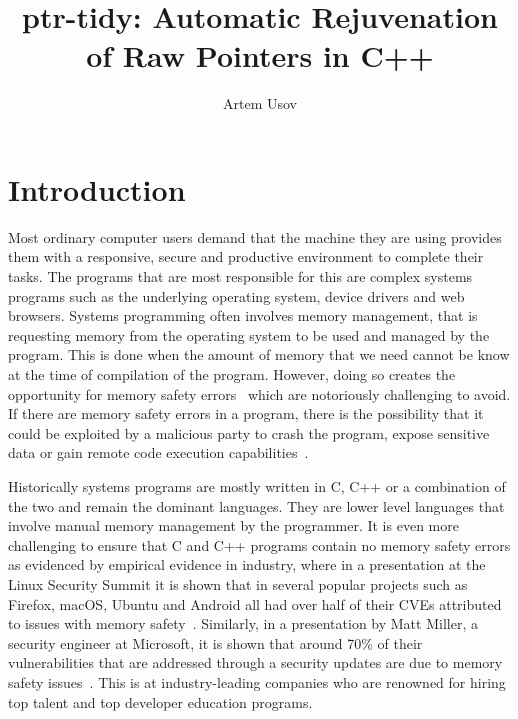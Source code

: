 \documentclass{mpaper}
\begin{document}
    \title{ptr-tidy: Automatic Rejuvenation of Raw Pointers in C++}
    \author{Artem Usov}

    \maketitle




    \begin{abstract}
    \end{abstract}




    \section{Introduction}\label{sec:introduction}
    
    Most ordinary computer users demand that the machine they are using provides them with a responsive, secure and productive environment to complete their tasks.
    The programs that are most responsible for this are complex systems programs such as the underlying operating system, device drivers and web browsers.
    Systems programming often involves memory management, that is requesting memory from the operating system to be used and managed by the program.
    This is done when the amount of memory that we need cannot be know at the time of compilation of the program.
    However, doing so creates the opportunity for memory safety errors~\cite{Dhurjati2003} which are notoriously challenging to avoid.
    If there are memory safety errors in a program, there is the possibility that it could be exploited by a malicious party to crash the program, expose sensitive data or gain remote code execution capabilities~\cite{Afek2007}.

    Historically systems programs are mostly written in C, C++ or a combination of the two and remain the dominant languages.
    They are lower level languages that involve manual memory management by the programmer.
    It is even more challenging to ensure that C and C++ programs contain no memory safety errors as evidenced by empirical evidence in industry, where in a presentation at the Linux Security Summit it is shown that in several popular projects such as Firefox, macOS, Ubuntu and Android all had over half of their CVEs attributed to issues with memory safety~\cite{Gaynor2020}.
    Similarly, in a presentation by Matt Miller, a security engineer at Microsoft, it is shown that around 70\% of their vulnerabilities that are addressed through a security updates are due to memory safety issues~\cite{Miller2019}. 
    This is at industry-leading companies who are renowned for hiring top talent and top developer education programs.
\end{document}
